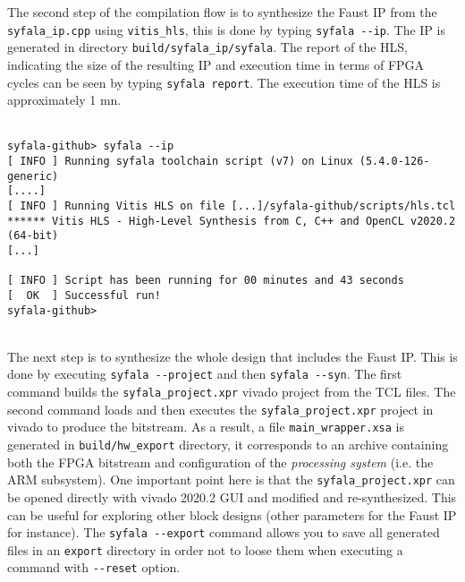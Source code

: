 The second step of the compilation flow is to synthesize the Faust IP from the {\tt syfala\_ip.cpp} using {\tt vitis\_hls}, this is done by typing \verb#syfala --ip#.
The IP is generated in directory {\tt build/syfala\_ip/syfala}. The report of the HLS, indicating the size of the resulting IP and execution time in terms of FPGA cycles can be seen by typing {\tt syfala report}.
The execution time of the HLS is approximately 1 mn.\\
~\\
\begin{boxedminipage}{\textwidth}
  \small
\begin{verbatim}
syfala-github> syfala --ip
[ INFO ] Running syfala toolchain script (v7) on Linux (5.4.0-126-generic)
[....]
[ INFO ] Running Vitis HLS on file [...]/syfala-github/scripts/hls.tcl
****** Vitis HLS - High-Level Synthesis from C, C++ and OpenCL v2020.2 (64-bit)
[...]

[ INFO ] Script has been running for 00 minutes and 43 seconds
[  OK  ] Successful run!
syfala-github>
\end{verbatim}
\end{boxedminipage}
~\\

The next step is to synthesize the whole design that includes the Faust IP. This is done by executing \verb#syfala --project# and then \verb#syfala --syn#. The first command builds the {\tt syfala\_project.xpr} vivado project from the TCL files. The second command loads and then executes the {\tt syfala\_project.xpr} project in vivado to produce the bitstream. As a result, a  file {\tt main\_wrapper.xsa} is generated in {\tt build/hw\_export} directory, it corresponds to an archive containing both the FPGA bitstream and configuration of the {\em processing system} (i.e. the ARM subsystem). One important point here is that the {\tt syfala\_project.xpr} can be opened directly with vivado 2020.2 GUI and modified and re-synthesized. This can be useful for exploring other block designs (other parameters for the Faust IP for instance). The \verb#syfala --export# command allows you to save all generated files in an {\tt export} directory in order not to loose them when executing a command with \verb#--reset# option.\\

